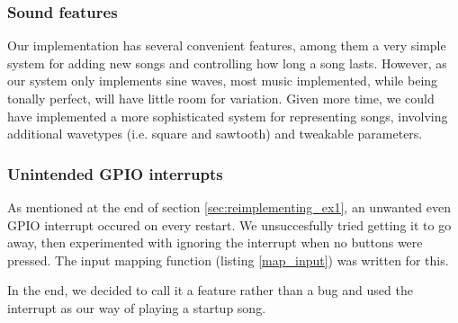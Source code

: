 \subsubsection{Sound features}
Our implementation has several convenient features, among them a very simple system for adding new songs and controlling how long a song lasts. However, as our system only implements sine waves, most music implemented, while being tonally perfect, will have little room for variation. Given more time, we could have implemented a more sophisticated system for representing songs, involving additional wavetypes (i.e. square and sawtooth) and tweakable parameters.

\subsubsection{Unintended GPIO interrupts}
As mentioned at the end of section \ref{sec:reimplementing_ex1}, an unwanted even GPIO interrupt occured on every restart. We unsuccesfully tried getting it to go away, then experimented with ignoring the interrupt when no buttons were pressed. The input mapping function (listing \ref{map_input}) was written for this.

In the end, we decided to call it a feature rather than a bug and used the interrupt as our way of playing a startup song.
